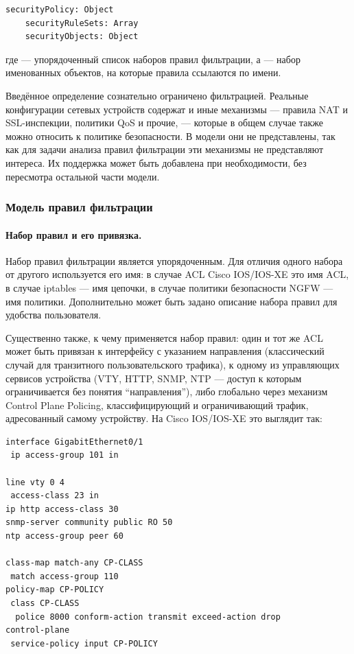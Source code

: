 \begin{lstlisting}[style=schemastyle]
securityPolicy: Object
    securityRuleSets: Array
    securityObjects: Object
\end{lstlisting}

где  --- упорядоченный список наборов правил фильтрации, а  --- набор именованных объектов, на которые правила ссылаются по имени.

Введённое определение сознательно ограничено фильтрацией. Реальные конфигурации сетевых устройств содержат и иные механизмы --- правила NAT и SSL-инспекции, политики QoS и прочие, --- которые в общем случае также можно относить к политике безопасности. В модели они не представлены, так как для задачи анализа правил фильтрации эти механизмы не представляют интереса. Их поддержка может быть добавлена при необходимости, без пересмотра остальной части модели.

\subsubsection{Модель правил фильтрации}

\paragraph{Набор правил и его привязка.} Набор правил фильтрации является упорядоченным. Для отличия одного набора от другого используется его имя: в случае ACL Cisco IOS/IOS-XE это имя ACL, в случае iptables --- имя цепочки, в случае политики безопасности NGFW --- имя политики. Дополнительно может быть задано описание набора правил для удобства пользователя.

Существенно также, к чему применяется набор правил: один и тот же ACL может быть привязан к интерфейсу с указанием направления (классический случай для транзитного пользовательского трафика), к одному из управляющих сервисов устройства (VTY, HTTP, SNMP, NTP --- доступ к которым ограничивается без понятия ``направления''), либо глобально через механизм Control Plane Policing, классифицирующий и ограничивающий трафик, адресованный самому устройству. На Cisco IOS/IOS-XE это выглядит так:

\begin{verbatim}
interface GigabitEthernet0/1
 ip access-group 101 in

line vty 0 4
 access-class 23 in
ip http access-class 30
snmp-server community public RO 50
ntp access-group peer 60

class-map match-any CP-CLASS
 match access-group 110
policy-map CP-POLICY
 class CP-CLASS
  police 8000 conform-action transmit exceed-action drop
control-plane
 service-policy input CP-POLICY
\end{verbatim}

